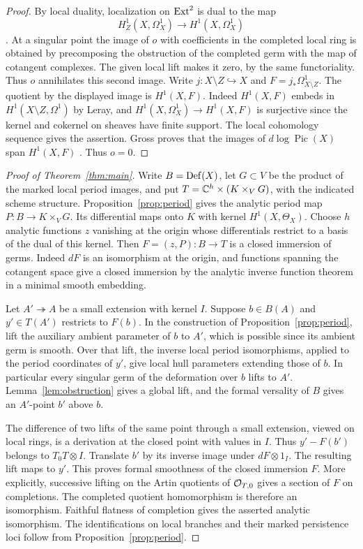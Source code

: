 \begin{proof}
By local duality, localization on $\operatorname{Ext}^2$ is dual to the map
\[
 H^1_Z(X,\Omega_X^1)\longrightarrow H^1(X,\Omega_X^1)
\]
\cite[Lemma~2.4(c)]{Gross}. At a singular point the image of $o$
with coefficients in the completed local ring is obtained by
precomposing the obstruction of the completed germ with the map
of cotangent complexes. The given local lift makes it zero, by the
same functoriality. Thus $o$ annihilates this second image. Write $j:X\setminus Z\hookrightarrow X$ and
$F=j_*\Omega^1_{X\setminus Z}$. The quotient by the displayed image is
$H^1(X,F)$. Indeed $H^1(X,F)$ embeds in $H^1(X\setminus Z,\Omega^1)$
by Leray, and $H^1(X,\Omega_X^1)\to H^1(X,F)$ is surjective since the
kernel and cokernel on sheaves have finite support. The local cohomology
sequence gives the assertion. Gross proves that the images of
$d\log\operatorname{Pic}(X)$ span $H^1(X,F)$
\cite[Lemma~2.5]{Gross}. Thus $o=0$.
\end{proof}

\begin{proof}[Proof of Theorem~\ref{thm:main}]
Write $B=\operatorname{Def}(X)$, let $G\subset V$ be the product of the marked local
period images, and put $T=\mathbb C^h\times(K\times_VG)$, with the indicated
scheme structure. Proposition~\ref{prop:period} gives the analytic
period map $P:B\to K\times_VG$. Its differential maps onto $K$ with
kernel $H^1(X,\Theta_X)$. Choose $h$ analytic functions $z$ vanishing
at the origin whose differentials restrict to a basis of the dual of this kernel. Then $F=(z,P):B\to T$ is a closed immersion of germs. Indeed
$dF$ is an isomorphism at the origin, and functions spanning the
cotangent space give a closed immersion by the analytic inverse
function theorem in a minimal smooth embedding.

Let $A'\twoheadrightarrow A$ be a small extension with kernel $I$.
Suppose $b\in B(A)$ and $y'\in T(A')$ restricts to $F(b)$. In the
construction of Proposition~\ref{prop:period}, lift the auxiliary
ambient parameter of $b$ to $A'$, which is possible since its ambient
germ is smooth. Over that lift, the inverse local period isomorphisms,
applied to the period coordinates of $y'$, give local hull parameters
extending those of $b$. In particular every singular germ of the
deformation over $b$ lifts to $A'$. Lemma~\ref{lem:obstruction} gives
a global lift, and the formal versality of $B$ gives an $A'$-point
$b'$ above $b$.

The difference of two lifts of the same point through a small
extension, viewed on local rings, is a derivation at the closed point
with values in $I$. Thus $y'-F(b')$ belongs to $T_0T\otimes I$.
Translate $b'$ by its inverse image under $dF\otimes 1_I$. The
resulting lift maps to $y'$. This proves formal smoothness of the
closed immersion $F$. More explicitly, successive lifting on the
Artin quotients of $\mathcal O_{T,0}$ gives a section of $F$ on completions.
The completed quotient homomorphism is therefore an isomorphism.
Faithful flatness of completion gives the asserted analytic
isomorphism. The identifications on local branches and their marked
persistence loci follow from Proposition~\ref{prop:period}.
\end{proof}
